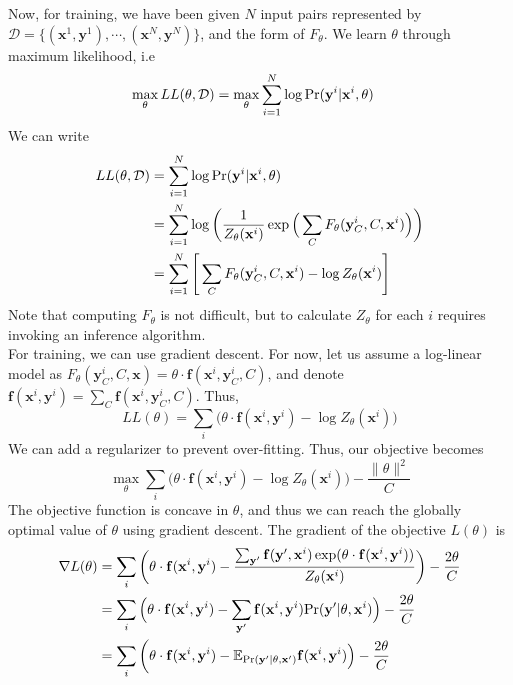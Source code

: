 Now, for training, we have been given $N$ input pairs represented by $\mathcal{D} = \{(\mathbf x^1, \mathbf y^1), \cdots, (\mathbf x^N, \mathbf y^N)\}$, and the form of $F_\theta$. We learn $\theta$ through maximum likelihood, i.e
\begin{equation}
	\begin{split}
	\max_{\theta} LL(\theta, \mathcal D) &= \max_\theta \sum_{i=1}^N \log\text{Pr}(\mathbf{y}^i|\mathbf{x}^i, \theta)
	\end{split}
\end{equation}
We can write
\begin{equation}
\begin{split}
	LL(\theta, \mathcal{D}) &= \sum_{i=1}^N \log\text{Pr}(\mathbf{y}^i|\mathbf{x}^i, \theta) \\
	&= \sum_{i=1}^N \log\bigg(\dfrac{1}{Z_\theta(\mathbf x^i)} \exp\Big(\sum_C F_\theta(\mathbf y^i_C, C, \mathbf x^i)\Big)\bigg) \\
	&= \sum_{i=1}^N \Bigg[\sum_C F_\theta(\mathbf y^i_C, C, \mathbf x^i) - \log Z_\theta(\mathbf x^i) \Bigg]
\end{split}
\end{equation}
Note that computing $F_\theta$ is not difficult, but to calculate $Z_\theta$ for each $i$ requires invoking an inference algorithm. \\
For training, we can use gradient descent. For now, let us assume a log-linear model as $F_\theta(\mathbf y_C^i, C, \mathbf x) = \theta\cdot \mathbf f(\mathbf x^i, \mathbf y^i_C, C)$, and denote $\mathbf f(\mathbf x^i, \mathbf y^i) = \sum_C\mathbf f(\mathbf x^i, \mathbf y^i_C, C)$. Thus,
\begin{equation}
LL(\theta) = \sum_{i} \Big(\theta\cdot\mathbf f(\mathbf x^i, \mathbf y^i) - \log Z_\theta(\mathbf x^i) \Big)
\end{equation}
We can add a regularizer to prevent over-fitting. Thus, our objective becomes
\begin{equation}
	\max_{\theta} \sum_i \Big(\theta\cdot\mathbf f(\mathbf x^i, \mathbf y^i) - \log Z_\theta(\mathbf x^i) \Big) - \dfrac{\|\theta\|^2}{C}
\end{equation}
The objective function is concave in $\theta$, and thus we can reach the globally optimal value of $\theta$ using gradient descent. The gradient of the objective $L(\theta)$ is 
\begin{equation}
\begin{split}
	\nabla L(\theta) &=  \sum_i \bigg(\theta\cdot\mathbf f(\mathbf x^i, \mathbf y^i) - \dfrac{\sum_{\mathbf y'} \mathbf f(\mathbf y', \mathbf x^i) \exp(\theta \cdot \mathbf f(\mathbf x^i, \mathbf y^i))}{Z_\theta(\mathbf x^i)}\bigg) - \dfrac{2\theta}{C} \\
	&= \sum_i \Big(\theta\cdot\mathbf f(\mathbf x^i, \mathbf y^i) - \sum_{\mathbf y'} \mathbf f(\mathbf x^i, \mathbf y^i)\text{Pr}(\mathbf y'|\theta, \mathbf x^i)\Big) - \dfrac{2\theta}{C} \\
	&= \sum_i \bigg(\theta\cdot\mathbf f(\mathbf x^i, \mathbf y^i) - \mathbb{E}_{\text{Pr}(\mathbf y'| \theta, \mathbf x')} \mathbf f(\mathbf x^i, \mathbf y^i)\Big) - \dfrac{2\theta}{C}
\end{split} 
\end{equation}
